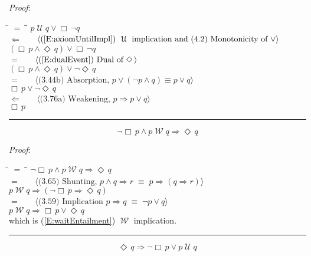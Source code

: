 \documentclass[12pt, fleqn, leqno]{article}
\newcommand{\lgap}{2pt}                             %
\newcommand{\mymathindent}{24pt}                    %
\newcommand{\equivs}{\ensuremath{\;\equiv\;}}       %
\newcommand{\impl}{\ensuremath{\Rightarrow}}        %
\newcommand{\foll}{\ensuremath{\Leftarrow}}         %
\newcommand{\Until}{\;\mathcal{U}\;}
\newcommand{\Wait}{\;\mathcal{W}\;}
\newcommand{\Event}{\Diamond\,}
\newcommand{\Always}{\Box\,}
\newcommand{\myqed}{\rule[-.23ex]{1.2ex}{2.0ex}}
\newcommand{\myqedtab}{\hspace{384pt}}              %
\newcommand{\Gll} {\langle}                         %
\newcommand{\Ggg} {\rangle}                         %
\newcommand{\Hint}[1]     {\ \ \ $\Gll              \mbox{#1} \Ggg$ }   %
\begin{document}
\emph{Proof}:
\begin{tabbing}
\hspace{\mymathindent} \= $= \;$ \= \myqedtab \= \kill
\> \> $p \Until q \lor \Always\neg q$\\[\lgap]
\> $\foll$ \> \Hint{(\ref{E:axiomUntilImpl}) $\Until$ implication and (4.2) Monotonicity of $\lor$} \\[\lgap]
\> \> $(\Always p \land \Event q) \lor \Always\neg q$\\[\lgap]
\> $=$  \>  \Hint{(\ref{E:dualEvent}) Dual of $\Event$}\\[\lgap]
\> \> $(\Always p \land \Event q) \lor \neg \Event q$\\[\lgap]
\> $=$  \>  \Hint{(3.44b) Absorption, $p \lor (\neg p \land q) \equiv p \lor q$}\\[\lgap]
\> \> $\Always p \lor \neg \Event q$\\[\lgap]
\> $\foll$ \> \Hint{(3.76a) Weakening, $p\impl p\lor q$} \\[\lgap]
\> \> $\Always p$ \quad \myqed
\end{tabbing}
\begin{equation}\label{E:waitEntailEvent}
\neg\Always p\land p \Wait q \impl \Event q
\end{equation}

\emph{Proof}:
\begin{tabbing}
\hspace{\mymathindent} \= $= \;$ \= \myqedtab \= \kill
\> \> $\neg\Always p\land p \Wait q \impl \Event q$\\[\lgap]
\> $=$  \>  \Hint{(3.65) Shunting, $p\land q \impl r \equivs p \impl (q \impl r)$}\\[\lgap]
\> \> $p\Wait q \impl (\neg\Always p\impl \Event q)$\\[\lgap]
\> $=$  \>  \Hint{(3.59) Implication $p\impl q \equivs \neg p \lor q$}\\[\lgap]
\> \> $p\Wait q \impl \Always p\lor \Event q$\\[\lgap]
\> which is (\ref{E:waitEntailment}) $\Wait$ implication. \quad \myqed
\end{tabbing}
\begin{equation}\label{E:untilEntailEvent}
\Event q\impl \neg\Always p\lor p \Until q
\end{equation}
\end{document}
